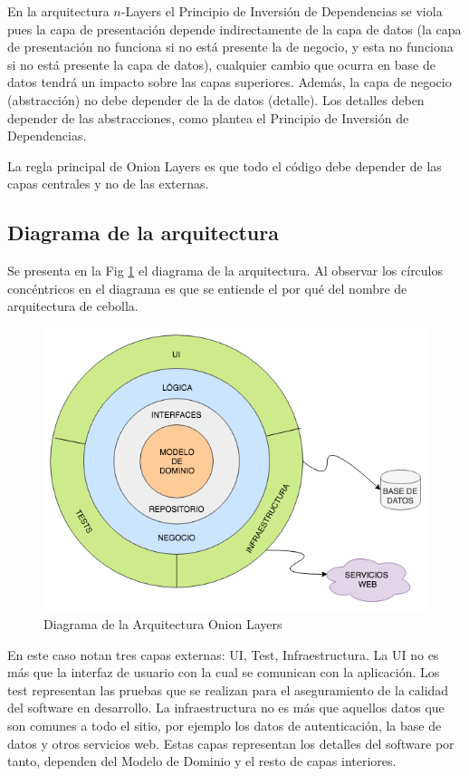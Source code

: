 En la arquitectura $n$-Layers el Principio de Inversión de Dependencias se viola pues la capa de presentación depende indirectamente de la capa de datos (la capa de presentación no funciona si no está presente la de negocio, y esta no funciona si no está presente la capa de datos), cualquier cambio que ocurra en base de datos tendrá un impacto sobre las capas superiores. Además, la capa de negocio (abstracción) no debe depender de la de datos (detalle). Los detalles deben depender de las abstracciones, como plantea el Principio de Inversión de Dependencias.

La regla principal de Onion Layers es que todo el código debe depender de las capas centrales y no de las externas.

\subsection{Diagrama de la arquitectura}\label{sec:diagrmaArch}

Se presenta en la Fig \ref{fig:onion} el diagrama de la arquitectura. Al observar los círculos concéntricos en el diagrama es que se entiende el por qué del nombre de arquitectura de cebolla.

\begin{figure}[h!]
    \centering
    \includegraphics[width=13cm]{./chapters/img/architecture.png}

    \label{fig:onion}
    \caption{Diagrama de la Arquitectura Onion Layers}
\end{figure}

En este caso notan tres capas externas: UI, Test, Infraestructura. La UI no es más que la interfaz de usuario con la cual se comunican con la aplicación. Los test representan las pruebas que se realizan para el aseguramiento de la calidad del software en desarrollo. La infraestructura no es más que aquellos datos que son comunes a todo el sitio, por ejemplo los datos de autenticación, la base de datos y otros servicios web. Estas capas representan los detalles del software por tanto, dependen del Modelo de Dominio y el resto de capas interiores.

